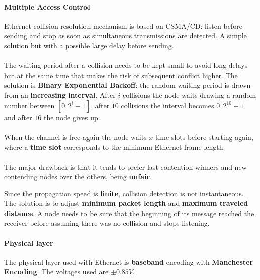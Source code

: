 \paragraph{Multiple Access Control} Ethernet collision resolution mechanism is based on CSMA/CD: listen before sending and stop as soon as simultaneous transmissions are detected. A simple solution but with a possible large delay before sending.\\\\
The waiting period after a collision needs to be kept small to avoid long delays but at the same time that makes the risk of subsequent conflict higher. The solution is \textbf{Binary Exponential Backoff}: the random waiting period is drawn from an \textbf{increasing interval}. After $i$ collisions the node waits drawing a random number between $[0, 2^i-1]$, after $10$ collisions the interval becomes $0, 2^{10}-1$ and after $16$ the node gives up.\\\\
When the channel is free again the node waits $x$ time slots before starting again, where a \textbf{time slot} corresponds to the minimum Ethernet frame length.\\\\
The major drawback is that it tends to prefer last contention winners and new contending nodes over the others, being \textbf{unfair}.

\begin{observation}
	Since the propagation speed is \textbf{finite}, collision detection is not instantaneous. The solution is to adjust \textbf{minimum packet length} and \textbf{maximum traveled distance}. A node needs to be sure that the beginning of its message reached the receiver before assuming there  was no collision and stops listening.
\end{observation}

\paragraph{Physical layer} The physical layer used with Ethernet is \textbf{baseband} encoding with \textbf{Manchester Encoding}. The voltages used are $\pm 0.85V$.

